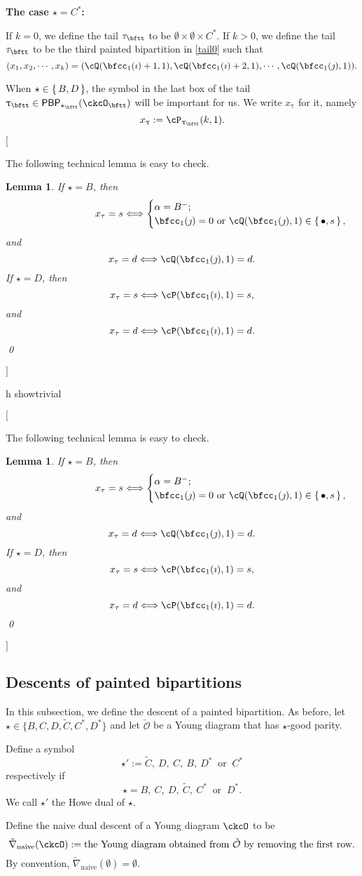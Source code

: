 \documentclass[12pt,a4paper]{amsart}
\newcommand{\trivial}[2][]{\if\relax\detokenize{#1}\relax
  {%
      \color{orange} \vspace{0em} $[$  #2 $]$
      \color{black}
  }
  \else
\ifx#1h
\ifcsname showtrivial\endcsname
{%
    \color{orange} \vspace{0em}  $[$ #2 $]$
    \color{black}
}
\fi
\else {\red Wrong argument!} \fi
\fi
}
\newcommand{\CO}{{\mathcal {O}}}
\def\tnaive{\mathrm{naive}}
\def\ckDD{{\check\DD}}
\def\DD{\nabla}
\def\ckDDn{{\ckDD}_{\tnaive}}
\numberwithin{equation}{section}
\newtheorem{lem}[thm]{Lemma}
\theoremstyle{remark}
\def\DD{\nabla}
\def\PBP{\mathsf{PBP}}
\begin{document}
{\bfseries The case $\star = C^*$:}

If $k=0$, we define the tail $\tau_{\bftt}$ to be
$\emptyset\times \emptyset \times C^{*}$.
If $k> 0$, we define the tail $\tau_\bftt$ to be the third painted bipartition in \eqref{tail0} such that
\[
  (x_1, x_2, \cdots, x_k)= (\cQ(\bfcc_{1}(\imath)+1,1),\cQ(\bfcc_{1}(\imath)+2,1),\cdots, \cQ(\bfcc_{1}(\jmath),1)).
\]


 When $\star \in \set{B,D}$, the symbol in the last box of the tail $\uptau_\bftt\in \PBP_{\star_\bftt}(\ckcO_\bftt)$ will be important for us. We write $x_\uptau$ for it, namely
\[
x_\uptau := \cP_{\uptau_\bftt}(k,1).
\]


\trivial[]{

 The following technical lemma is easy to check.

\begin{lem}\label{tailtip}
If $\star=B$, then
\[
\hspace{9em} x_\tau=s\Longleftrightarrow
\begin{cases}
  \alpha=B^-;\\
  \bfcc_1(\jmath)=0 \text{ or }\cQ(\bfcc_{1}(\jmath),1) \in\set{\bullet, s},
  \end{cases}
\]
and
\[
x_\tau=d \Longleftrightarrow
\cQ(\bfcc_{1}(\jmath),1) =d.
\]
If $\star=D$, then
\[
x_\tau=s\Longleftrightarrow \cP(\bfcc_{1}(\imath),1) = s,
\]
and
\[
x_\tau=d\Longleftrightarrow \cP(\bfcc_{1}(\imath),1) =d.
\]
\qed
\end{lem}
}

\subsection{Descents of painted bipartitions}\label{sec:comb}


In this subsection, we define the descent of a painted bipartition.
As before, let  $\star\in \{ B, C,  D, \widetilde{C},  C^*, D^*\}$ and let $\check \CO$ be a Young diagram that has $\star$-good parity.


Define a symbol
\[
\star':=\widetilde{C}, \ D, \  C, \ B, \ D^*\  \textrm{ or } \ C^*
\]
respectively if
\[
\star=B,\  C, \ D, \ \widetilde{C}, \ C^* \ \textrm{ or }\  D^*.
\]
We call $\star'$
 the Howe dual of $\star$.

 Define the naive dual descent of a Young diagram $\ckcO$ to be
 \[
  \ckDDn(\ckcO):= \textrm{the Young diagram obtained from $\check \CO$ by removing the first row}.
  \]
   By convention, $\check \nabla_{\mathrm{naive}}(\emptyset)=\emptyset$.
\end{document}
